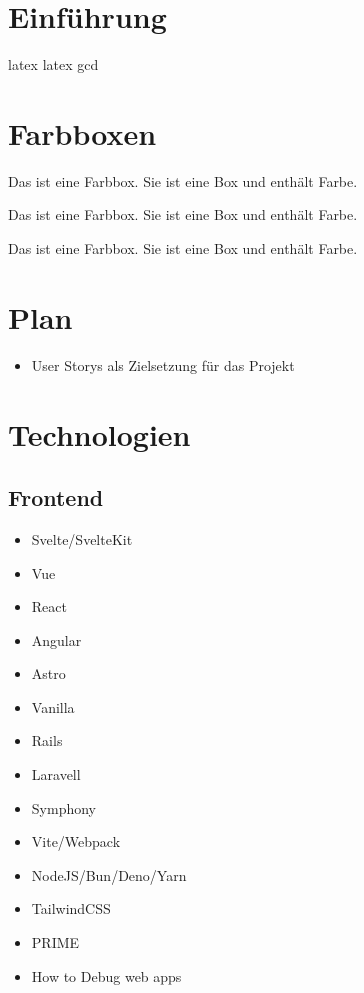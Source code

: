 \documentclass[../main.tex]{subfiles}
\begin{document}

\section{Einführung}
\cite{sansom1958history}
\gls{latex}
\Gls{latex}
\acrshort{gcd}
\lipsum[1-2]

\newpage
\section{Farbboxen}
\begin{tcolorbox}[colback=orange!5!white,colframe=orange!75!black,title=\textbf{Farbboxe Orange}]
Das ist eine Farbbox. Sie ist eine Box und enthält Farbe.
\end{tcolorbox}

\begin{tcolorbox}[colback=red!5!white,colframe=red!75!black,title=\textbf{Farbboxe Rot}]
Das ist eine Farbbox. Sie ist eine Box und enthält Farbe.
\end{tcolorbox}

\begin{tcolorbox}[colback=blue!5!white,colframe=blue!75!black,title=\textbf{Farbboxe Blau}]
Das ist eine Farbbox. Sie ist eine Box und enthält Farbe.
\end{tcolorbox}

\newpage
\section{Plan}
\begin{itemize}
    \item User Storys als Zielsetzung für das Projekt
\end{itemize}

\section{Technologien}
\subsection{Frontend}
\begin{itemize}
    \item Svelte/SvelteKit
    \item Vue
    \item React
    \item Angular
    \item Astro
    \item Vanilla
    \item Rails
    \item Laravell
    \item Symphony
    \item Vite/Webpack
    \item NodeJS/Bun/Deno/Yarn
    \item TailwindCSS
    \item PRIME
    \item How to Debug web apps
\end{itemize}
\end{document}
